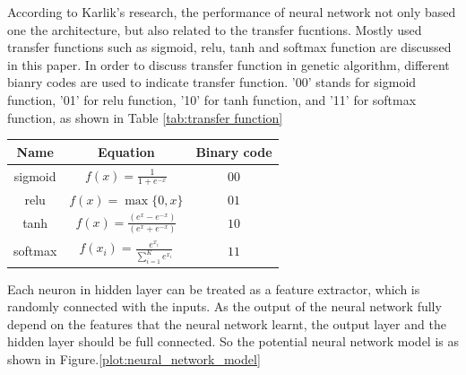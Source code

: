 \documentclass[smallextended]{svjour3}       %
\begin{document}
\begin{multicols}{2}
According to Karlik's\cite{karlik2011performance} research, the performance of
neural network not only based one the architecture, but also related to the
transfer fucntions. Mostly used transfer functions such as  sigmoid, relu, tanh and
softmax function are discussed in this paper. In order to discuss transfer
function in genetic algorithm,  different bianry codes are used to indicate
transfer function.  '00' stands for sigmoid function, '01' for relu function,
'10' for tanh function, and '11' for softmax function, as shown in Table
\ref{tab:transfer function}


\begin{center}
\begin{tabular}{ccc}
	\toprule
	Name 				 & Equation                                   & Binary
	code\\
	\midrule
	sigmoid              & $ f(x)=\frac{1}{1+e^{-x}} $  & $00$ \\
	relu                 & $ f(x)=\max \{0, x\} $       & $01$ \\
	tanh                 & $
	f(x)=\frac{\left(e^{x}-e^{-x}\right)}{\left(e^{x}+e^{-x}\right)} $&
	$10$ \\
	softmax                 & $
	f(x_i)=\frac{e^{x_i}}{\sum_{i=1}^{K} e^{x_i}}
							$ & $11$ \\
	\bottomrule
\end{tabular}
\label{tab:transfer function}
\end{center}



Each neuron in hidden layer can be treated as a feature extractor, which is
randomly connected with the inputs.  As the output of the neural network fully 
depend on the features that the neural network learnt, the output layer and
the hidden layer should be full connected.  So the potential neural network
model is as shown in Figure.\ref{plot:neural_network_model} 
\begin{center}
\end{center}
\end{multicols}
\end{document}
